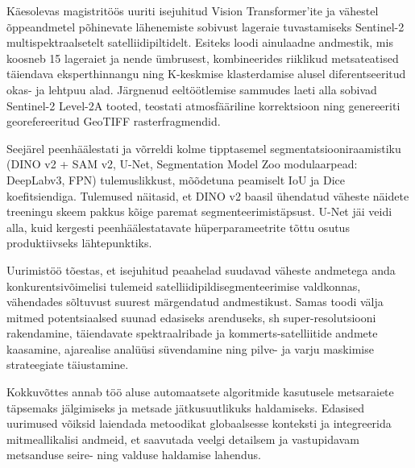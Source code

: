 Käesolevas magistritöös uuriti isejuhitud Vision Transformer'ite ja vähestel
õppeandmetel põhinevate lähenemiste sobivust lageraie tuvastamiseks Sentinel-2
multispektraalsetelt satelliidipiltidelt. Esiteks loodi ainulaadne andmestik,
mis koosneb 15 lageraiet ja nende ümbrusest, kombineerides riiklikud
metsateatised täiendava eksperthinnangu ning K-keskmise klasterdamise alusel
diferentseeritud okas- ja lehtpuu alad. Järgnenud eeltöötlemise sammudes laeti
alla sobivad Sentinel-2 Level-2A tooted, teostati atmosfääriline korrektsioon
ning genereeriti georefereeritud GeoTIFF rasterfragmendid.

Seejärel peenhäälestati ja võrreldi kolme tipptasemel segmentatsiooniraamistiku
(DINO v2 + SAM v2, U-Net, Segmentation Model Zoo modulaarpead: DeepLabv3, FPN)
tulemuslikkust, mõõdetuna peamiselt IoU ja Dice koefitsiendiga. Tulemused
näitasid, et DINO v2 baasil ühendatud väheste näidete treeningu skeem
pakkus kõige paremat segmenteerimistäpsust. U-Net jäi veidi alla, kuid
kergesti peenhäälestatavate hüperparameetrite tõttu osutus produktiivseks
lähtepunktiks.

Uurimistöö tõestas, et isejuhitud peaahelad suudavad väheste andmetega anda
konkurentsivõimelisi tulemeid satelliidipildisegmenteerimise valdkonnas,
vähendades sõltuvust suurest märgendatud andmestikust.
Samas toodi välja mitmed potentsiaalsed suunad edasiseks arenduseks, sh
super-resolutsiooni rakendamine, täiendavate spektraalribade ja
kommerts-satelliitide andmete kaasamine, ajarealise analüüsi süvendamine ning
pilve- ja varju maskimise strateegiate täiustamine.

Kokkuvõttes annab töö aluse automaatsete algoritmide kasutusele metsaraiete
täpsemaks jälgimiseks ja metsade jätkusuutlikuks haldamiseks. Edasised uurimused
võiksid laiendada metoodikat globaalsesse konteksti ja integreerida
mitmeallikalisi andmeid, et saavutada veelgi detailsem ja vastupidavam
metsanduse seire- ning valduse haldamise lahendus.

